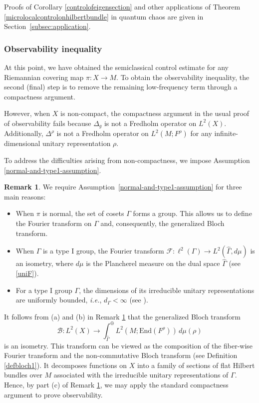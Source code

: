 \documentclass[11pt,oneside,reqno]{amsart}
\theoremstyle{definition}
\newtheorem{remark}[definition]{Remark}
\numberwithin{equation}{section}
\theoremstyle{plain}
\begin{document}
Proofs of Corollary \ref{controlofeigensection} and other applications of Theorem \ref{microlocalcontrolonhilbertbundle} in quantum chaos are given in Section~\ref{subsec:application}.

\subsubsection{Observability inequality}

At this point, we have obtained the semiclassical control estimate for any Riemannian covering map $\pi:X\rightarrow M$. To obtain the observability inequality, the second (final) step is to remove the remaining low-frequency term through a compactness argument. 

However, when $X$ is non-compact, the compactness argument in the usual proof of observability fails because $\Delta_g$ is not a Fredholm operator on $L^2(X)$. Additionally, $\Delta^{\rho}$ is not a Fredholm operator on $L^2(M;F^{\rho})$ for any infinite-dimensional unitary representation $\rho$.

To address the difficulties arising from non-compactness, we impose Assumption \ref{normal-and-type1-assumption}.

\begin{remark}\label{reasonoftype1}
We require Assumption~\ref{normal-and-type1-assumption} for three main reasons:
\begin{itemize}
    \item[(a)] When $\pi$ is normal, the set of cosets $\Gamma$ forms a group. This allows us to define the Fourier transform on $\Gamma$ and, consequently, the generalized Bloch transform.
    \item[(b)] When $\Gamma$ is a type I group, the Fourier transform $\mathcal{F}: \ell^2(\Gamma)\to L^2(\widehat{\Gamma},d\mu)$ is an isometry, where $d\mu$ is the Plancherel measure on the dual space $\widehat{\Gamma}$ (see \eqref{uniF}).
    \item[(c)] For a type I group $\Gamma$, the dimensions of its irreducible unitary representations are uniformly bounded, \emph{i.e.}, $d_\Gamma<\infty$ (see \cite[Theorem 4]{kocabova2008generalized}). 
\end{itemize}
\end{remark}

It follows from (a) and (b) in Remark \ref{reasonoftype1} that the generalized Bloch transform 
\begin{equation}\label{introBiso}
    \mathcal{B}: L^2(X) \to \int_{\widehat{\Gamma}}^{\oplus}L^2(M;\mathrm{End}(F^{\rho}))\,d\mu(\rho)
\end{equation}
is an isometry. This transform can be viewed as the composition of the fiber-wise Fourier transform and the non-commutative Bloch transform (see Definition \ref{defbloch1}). It decomposes functions on $X$ into a family of sections of flat Hilbert bundles over $M$ associated with the irreducible unitary representations of $\Gamma$. Hence, by part (c) of Remark \ref{reasonoftype1}, we may apply the standard compactness argument to prove observability.
\end{document}

